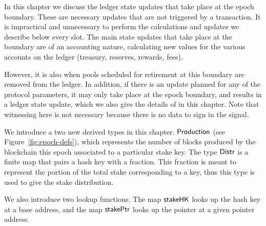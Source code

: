 \newcommand{\UTxOEpState}{\type{UTxOEpState}}
\newcommand{\Accnt}{\type{Accnt}}
\newcommand{\AccntEnv}{\type{AccntEnv}}
\newcommand{\AccntState}{\type{AccntState}}
\newcommand{\StPlCleanEnv}{\type{StPlCleanEnv}}
\newcommand{\StPlCleanState}{\type{StPlCleanState}}
\newcommand{\NewProtoConstsEnv}{\type{NewProtoConstsEnv}}
\newcommand{\NewProtoConstsState}{\type{NewProtoConstsState}}
\newcommand{\EpochEnv}{\type{EpochEnv}}
\newcommand{\EpochState}{\type{EpochState}}
\newcommand{\Production}{\type{Production}}
\newcommand{\Distr}{\type{Distr}}

\newcommand{\obligation}[4]{\fun{obligation}~ \var{#1}~ \var{#2}~ \var{#3}~ \var{#4}}
\newcommand{\reward}[5]{\fun{reward}~ \var{#1}~ \var{#2}~ \var{#3}~ \var{#4}~ \var{#5}}
\newcommand{\isActive}[4]{\fun{isActive}~ \var{#1}~ \var{#2}~ \var{#3}~ \var{#4}}
\newcommand{\activeStake}[5]{\fun{activeStake}~ \var{#1}~ \var{#2}~ \var{#3}~ \var{#4}~ \var{#5}}
\newcommand{\poolRefunds}[3]{\fun{poolRefunds}~ \var{#1}~ \var{#2}~ \var{#3}}

In this chapter we discuss the ledger state updates that take place at the epoch
boundary. These are necessary updates that are not triggered by a transaction.
It is impractical and unnecessary to perform the calculations and updates we
describe below every slot. The main state updates that take place at the boundary
are of an accounting nature, calculating new values for the various accounts
on the ledger (treasury, reserves, rewards, fees).

However, it is also when
pools scheduled for retirement at this boundary are removed from the ledger.
In addition, if there is an update planned for any of the protocol parameters,
it may only take place at the epoch boundary, and results in a ledger state
update, which we also give the details of in this chapter.
Note that witnessing here is not necessary because there is no data to sign
in the signal.

We introduce a two new derived types in this chapter. $\Production$ (see
Figure~\ref{fig:epoch-defs}), which represents the number of blocks produced by
the blockchain this epoch associated to a particular stake key. The type
$\Distr$ is a finite map that pairs a hash key with a fraction. This fraction
is meant to represent the portion of the total stake corresponding to a key,
thus this type is used to give the stake distribution.

We also introduce two lookup functions. The map $\mathsf{stakeHK}$ looks up the
hash key at a base address, and the map $\mathsf{stakePtr}$ looks up the pointer
at a given pointer address.


